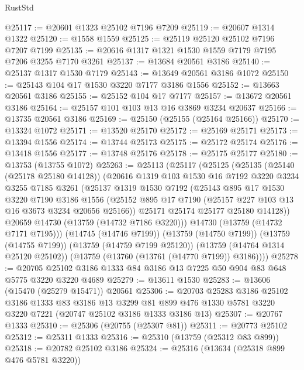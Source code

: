 \begin{lexlean}{RustStd}
\begin{coremodule}
@25117 := @20601 @1323 @25102 @7196 @7209
@25119 := @20607 @1314 @1322
@25120 := @1558 @1559
@25125 := @25119 @25120 @25102 @7196 @7207 @7199
@25135 := @20616 @1317 @1321 @1530 @1559 @7179 @7195 @7206 @3255 @7170 @3261
@25137 := @13684 @20561 @3186
@25140 := @25137 @1317 @1530 @7179
@25143 := @13649 @20561 @3186 @1072
@25150 := @25143 @104 @17 @1530 @3220 @7177 @3186 @1556
@25152 := @13663 @20561 @3186
@25155 := @25152 @104 @17 @7177
@25157 := @13672 @20561 @3186
@25164 := @25157 @101 @103 @13 @16 @3869 @3234 @20637
@25166 := @13735 @20561 @3186
@25169 := @25150 (@25155 (@25164 @25166))
@25170 := @13324 @1072
@25171 := @13520 @25170
@25172 := @25169 @25171
@25173 := @13394 @1556
@25174 := @13744 @25173
@25175 := @25172 @25174
@25176 := @13418 @1556
@25177 := @13748 @25176
@25178 := @25175 @25177
@25180 := @13753 (@13755 @1072)
@25263 := @25113
    (@25117
      (@25125
        (@25135
          (@25140 (@25178 @25180 @14128))
          (@20616
            @1319
            @103
            @1530
            @16
            @7192
            @3220
            @3234
            @3255
            @7185
            @3261
            (@25137
              @1319
              @1530
              @7192
              (@25143
                @895
                @17
                @1530
                @3220
                @7190
                @3186
                @1556
                (@25152 @895 @17 @7190 (@25157 @227 @103 @13 @16 @3673 @3234 @20656 @25166))
                @25171
                @25174
                @25177
                @25180
                @14128))
            @20659
            @14730
            (@13759 (@14732 @7186 @3220)))
          @14730
          (@13759 (@14732 @7171 @7195)))
        (@14745 (@14746 @7199))
        (@13759 (@14750 @7199))
        (@13759 (@14755 @7199))
        (@13759 (@14759 @7199 @25120))
        (@13759 (@14764 @1314 @25120 @25102))
        (@13759 (@13760 (@13761 (@14770 @7199)) @3186))))
@25278 := @20705 @25102 @3186 @1333 @84 @3186 @13 @7225 @50 @904 @83 @648 @5775 @3220 @3220 @4689
@25279 := @13611 @1530
@25283 := @13606 (@15470 (@25279 @15471)) @20561
@25306 := @20703
    @25283
    @3186
    @25102
    @3186
    @1333
    @83
    @3186
    @13
    @3299
    @81
    @899
    @476
    @1330
    @5781
    @3220
    @3220
    @7221
    (@20747 @25102 @3186 @1333 @3186 @13)
@25307 := @20767 @1333
@25310 := @25306 (@20755 (@25307 @81))
@25311 := @20773 @25102
@25312 := @25311 @1333
@25316 := @25310 (@13759 (@25312 @83 @899))
@25318 := @20782 @25102 @3186
@25324 := @25316 (@13634 (@25318 @899 @476 @5781 @3220))

\end{coremodule}
\end{lexlean}
